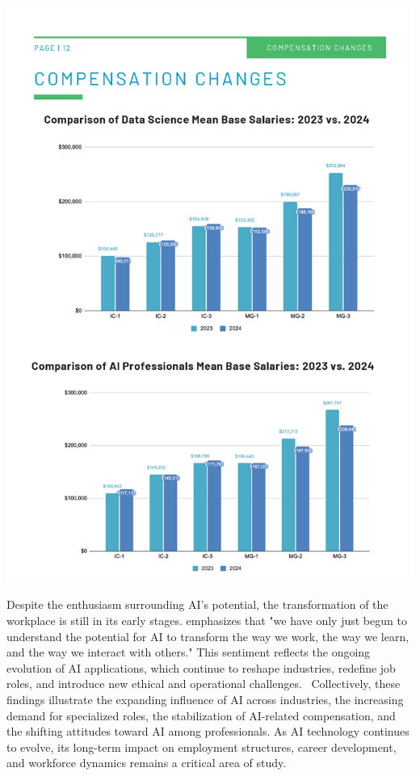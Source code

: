 \documentclass[12pt,a4paper]{article}
\begin{document}
\begin{multicols}{2}
\includegraphics[scale=0.3]{Comparision_Changes.jpg}
\label{fig:Comparision_Changes}

Despite the enthusiasm surrounding AI's potential, the transformation of the workplace is still in its early stages. \cite{linkedin2023future} emphasizes that "we have only just begun to understand the potential for AI to transform the way we work, the way we learn, and the way we interact with others." This sentiment reflects the ongoing evolution of AI applications, which continue to reshape industries, redefine job roles, and introduce new ethical and operational challenges.
\
Collectively, these findings illustrate the expanding influence of AI across industries, the increasing demand for specialized roles, the stabilization of AI-related compensation, and the shifting attitudes toward AI among professionals. As AI technology continues to evolve, its long-term impact on employment structures, career development, and workforce dynamics remains a critical area of study.


\end{multicols}
\end{document}
